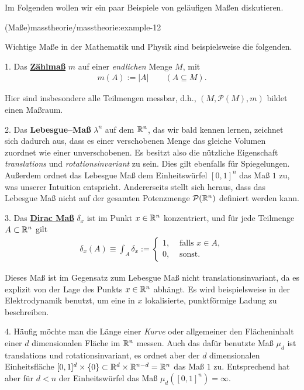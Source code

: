 \par
Im Folgenden wollen wir ein paar Beispiele von geläufigen Maßen diskutieren.
\begin{example}{(Maße)}{masstheorie/masstheorie:example-12}



\par
Wichtige Maße in der Mathematik und Physik sind beispielsweise die folgenden.

\par
1. Das \href{https://de.wikipedia.org/wiki/Z\%c3\%a4hlma\%c3\%9f\_(Ma\%c3\%9ftheorie)}{\textbf{Zählmaß}} \(m\) auf einer \emph{endlichen} Menge \(M\), mit
\begin{align*}
m(A):=|A|\qquad (A\subseteq M).
\end{align*}
\par
Hier sind insbesondere alle Teilmengen messbar, d.h., \((M, \mathcal{P}(M), m)\) bildet einen Maßraum.

\par
2. Das \textbf{Lebesgue–Maß} \(\lambda^n\) auf dem \(\mathbb{R}^n\), das wir bald kennen lernen, zeichnet sich dadurch aus, dass es einer verschobenen Menge das gleiche Volumen zuordnet wie einer unverschobenen.
Es besitzt also die nützliche Eigenschaft \emph{translations } und \emph{rotationsinvariant} zu sein.
Dies gilt ebenfalls für Spiegelungen.
Außerdem ordnet das Lebesgue Maß dem Einheitswürfel \([0,1]^n\) das Maß \(1\) zu, was unserer Intuition entspricht.
Andererseits stellt sich heraus, dass das Lebesgue Maß nicht auf der gesamten Potenzmenge \(\mathcal{P}(\mathbb{R}^n)\) definiert werden kann.

\par
3. Das \href{https://de.wikipedia.org/wiki/Diracma\%c3\%9f}{\textbf{Dirac Maß}} \(\delta_x\) ist im Punkt \(x \in \mathbb{R}^n\) konzentriert, und für jede Teilmenge \(A\subset\mathbb{R}^n\) gilt
\begin{align*}
\delta_x(A) \equiv \int_A\delta_x := \begin{cases} 1, &  \text{ falls } x \in A,\\ 0, & \text{ sonst}. \end{cases}
\end{align*}
\par
Dieses Maß ist im Gegensatz zum Lebesgue Maß nicht translationsinvariant, da es explizit von der Lage des Punkts \(x\in\mathbb{R}^n\) abhängt.
Es wird beispielsweise in der Elektrodynamik benutzt, um eine in \(x\) lokalisierte, punktförmige Ladung zu beschreiben.

\par
4. Häufig möchte man die Länge einer \emph{Kurve} oder allgemeiner den Flächeninhalt einer \(d\) dimensionalen Fläche im \(\mathbb{R}^n\) messen.
Auch das dafür benutzte Maß \(\mu_d\) ist translations  und rotationsinvariant, es ordnet aber der \(d\) dimensionalen Einheitsfläche \([0,1]^d\times\{0\} \subset\mathbb{R}^d\times\mathbb{R}^{n-d}=\mathbb{R}^n\) das Maß \(1\) zu.
Entsprechend hat aber für \(d<n\) der Einheitswürfel das Maß \(\mu_d([0,1]^n)=\infty\).


\end{example}
